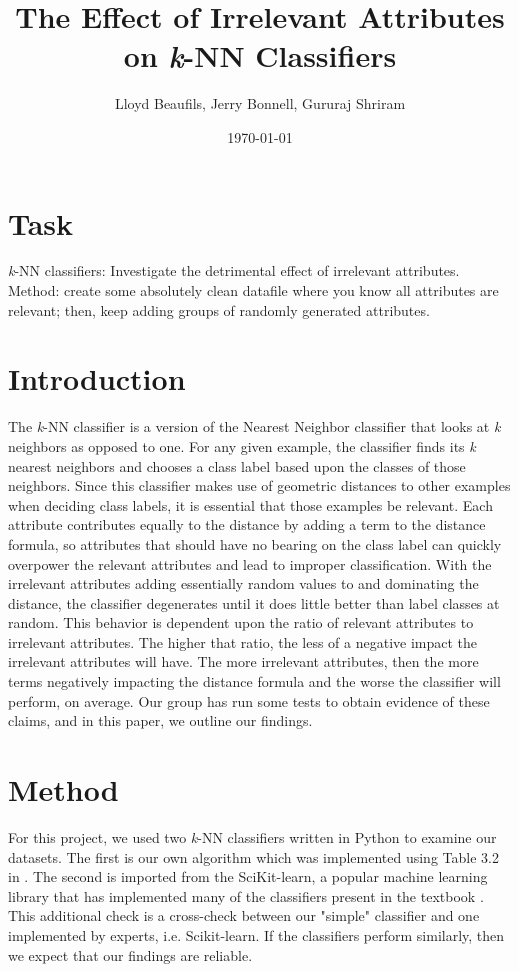 \documentclass{article}
\title{%
       The Effect of Irrelevant Attributes on \textit{\textit{k}}-NN Classifiers}
\author{Lloyd Beaufils, Jerry Bonnell, Gururaj Shriram}
\date{\today}
\begin{document}
\maketitle

\section{Task}

\textit{\textit{k}}-NN classifiers: Investigate the detrimental effect of irrelevant attributes. Method: create some absolutely clean datafile where you know all attributes are relevant; then, keep adding groups of randomly generated attributes.

\section{Introduction}

The \textit{\textit{k}}-NN classifier is a version of the Nearest Neighbor classifier that looks at \textit{\textit{k}} neighbors as opposed to one. For any given example, the classifier finds its \textit{\textit{k}} nearest neighbors and chooses a class label based upon the classes of those neighbors. Since this classifier makes use of geometric distances to other examples when deciding class labels, it is essential that those examples be relevant. Each attribute contributes equally to the distance by adding a term to the distance formula, so attributes that should have no bearing on the class label can quickly overpower the relevant attributes and lead to improper classification. With the irrelevant attributes adding essentially random values to and dominating the distance, the classifier degenerates until it does little better than label classes at random. This behavior is dependent upon the ratio of relevant attributes to irrelevant attributes. The higher that ratio, the less of a negative impact the irrelevant attributes will have. The more irrelevant attributes, then the more terms negatively impacting the distance formula and the worse the classifier will perform, on average. Our group has run some tests to obtain evidence of these claims, and in this paper, we outline our findings.

\section{Method}

For this project, we used two \textit{k}-NN classifiers written in Python to examine our datasets. The first is our own algorithm which was implemented using Table 3.2 in \cite{kubat}. The second is imported from the SciKit-learn, a popular machine learning library that has implemented many of the classifiers present in the textbook \cite{scikit}. This additional check is a cross-check between our "simple" classifier and one implemented by experts, i.e. Scikit-learn. If the classifiers perform similarly, then we expect that our findings are reliable.  \\  
\end{document}
